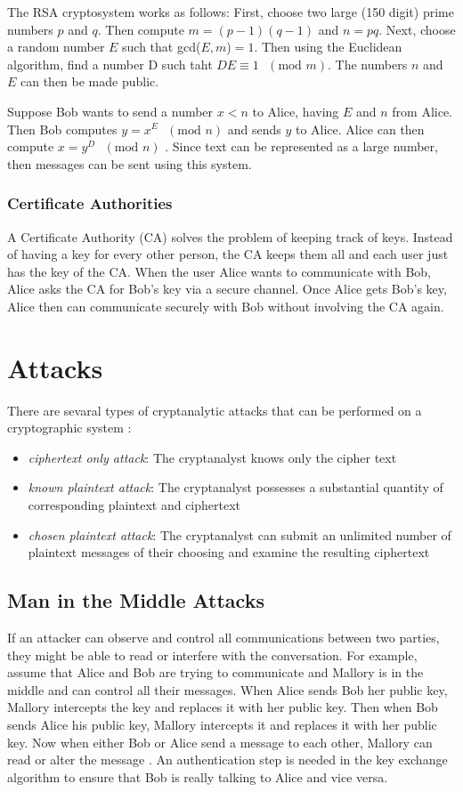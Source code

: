 \documentclass[12pt]{article}
\begin{document}
The RSA cryptosystem works as follows: First, choose two large (150 digit) prime numbers $p$ and $q$. Then compute $m=(p-1)(q-1)$ and $n=pq$. Next, choose a random number $E$ such that gcd($E,m$)$=1$. Then using the Euclidean algorithm, find a number D such taht $DE\equiv 1\text{ }(\text{mod }m)$. The numbers $n$ and $E$ can then be made public.

Suppose Bob wants to send a number $x<n$ to Alice, having $E$ and $n$ from Alice. Then Bob computes $y=x^E\text{ } (\text{mod }n)$ and sends $y$ to Alice. Alice can then compute $x=y^D\text{ }(\text{mod }n)$ \cite[pg. 101]{absalg}. Since text can be represented as a large number, then messages can be sent using this system.

\subsubsection{Certificate Authorities}
A Certificate Authority (CA) solves the problem of keeping track of keys. Instead of having a key for every other person, the CA keeps them all and each user just has the key of the CA. When the user Alice wants to communicate with Bob, Alice asks the CA for Bob's key via a secure channel. Once Alice gets Bob's key, Alice then can communicate securely with Bob without involving the CA again.

\section{Attacks}

There are sevaral types of cryptanalytic attacks that can be performed on a cryptographic system \cite{diffiehellman}:
\begin{itemize}
	\item{\textit{ciphertext only attack}: The cryptanalyst knows only the cipher text}
	\item{\textit{known plaintext attack}: The cryptanalyst possesses a substantial quantity of corresponding plaintext and ciphertext}
	\item{\textit{chosen plaintext attack}: The cryptanalyst can submit an unlimited number of plaintext messages of their choosing and examine the resulting ciphertext}
\end{itemize}

\subsection{Man in the Middle Attacks}
If an attacker can observe and control all communications between two parties, they might be able to read or interfere with the conversation. For example, assume that Alice and Bob are trying to communicate and Mallory is in the middle and can control all their messages. When Alice sends Bob her public key, Mallory intercepts the key and replaces it with her public key. Then when Bob sends Alice his public key, Mallory intercepts it and replaces it with her public key. Now when either Bob or Alice send a message to each other, Mallory can read or alter the message \cite[pg. 48]{appcrypt}. An authentication step is needed in the key exchange algorithm to ensure that Bob is really talking to Alice and vice versa.
\end{document}

